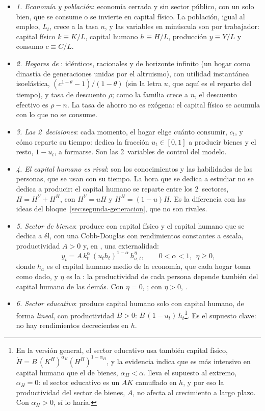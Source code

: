 \documentclass[11pt]{article}
\begin{document}
\begin{itemize}
\item \emph{1. Economía y población}: economía cerrada y sin sector público, con un solo bien, que se consume o se invierte en capital físico. La población, igual al empleo, $L_t$, crece a la tasa $n$, y las variables en minúscula son por trabajador: capital físico $k\equiv K/L$, capital humano $h\equiv H/L$, producción $y\equiv Y/L$ y consumo $c\equiv C/L$.
\item \emph{2. Hogares de }: idénticos, racionales y de horizonte infinito (un hogar como dinastía de generaciones unidas por el altruismo\nocite{Barro1974}), con utilidad instantánea isoelástica, $(c^{1-\theta}-1)/(1-\theta)$ (sin la letra $u$, que aquí es el reparto del tiempo), y tasa de descuento $\rho$; como la familia crece a $n$, el descuento efectivo es $\rho-n$. La tasa de ahorro no es exógena: el capital físico se acumula con lo que no se consume.
\item \emph{3. Las 2~decisiones}: cada momento, el hogar elige cuánto consumir, $c_t$, y cómo reparte su tiempo: dedica la fracción $u_t\in[0,1]$ a producir bienes y el resto, $1-u_t$, a formarse. Son las 2~variables de control del modelo.
\item \emph{4. El capital humano es rival}: son los conocimientos y las habilidades de las personas, que se usan con su tiempo. La hora que se dedica a estudiar no se dedica a producir: el capital humano se reparte entre los 2~sectores, $H=H^Y+H^H$, con $H^Y=uH$ y $H^H=(1-u)H$. Es la diferencia con las ideas del bloque~\ref{sec:segunda-generacion}, que no son rivales.
\item \emph{5. Sector de bienes}: produce con capital físico y el capital humano que se dedica a él, con una Cobb-Douglas con rendimientos constantes a escala, productividad $A>0$ y, en \textcite{Lucas1988}, una externalidad:
  \[y_t=A\,k_t^{\alpha}\,(u_th_t)^{1-\alpha}\,h_{a,t}^{\eta},\qquad 0<\alpha<1,\ \ \eta\geq0,\]
  donde $h_a$ es el capital humano medio de la economía, que cada hogar toma como dado, y $\eta$ es la : la productividad de cada persona depende también del capital humano de las demás. Con $\eta=0$, ; con $\eta>0$, .
\item \emph{6. Sector educativo}: produce capital humano solo con capital humano, de forma \emph{lineal}, con productividad $B>0$: $B\,(1-u_t)\,h_t$\footnote{En la versión general, el sector educativo usa también capital físico, $\dot H=B\,(K^H)^{\alpha_H}(H^H)^{1-\alpha_H}$, y la evidencia indica que es más intensivo en capital humano que el de bienes, $\alpha_H<\alpha$. \textcite{Lucas1988} lleva el supuesto al extremo, $\alpha_H=0$: el sector educativo es un $AK$ camuflado en $h$, y por eso la productividad del sector de bienes, $A$, no afecta al crecimiento a largo plazo. Con $\alpha_H>0$, sí lo haría\nocite{BarroSalaiMartin2004}.}. Es el supuesto clave: no hay rendimientos decrecientes en $h$.

\end{itemize}
\end{document}
